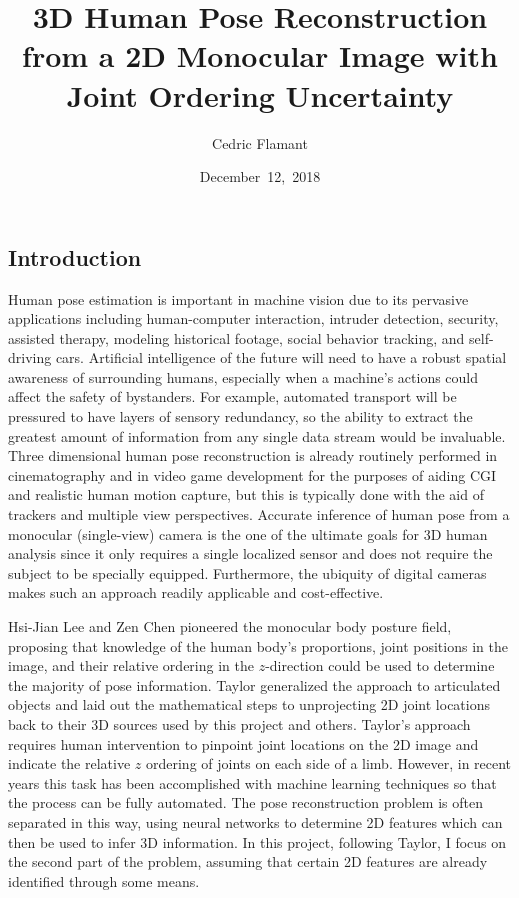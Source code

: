 \documentclass[final]{article}
\newcommand{\LectureTitle}{3D Human Pose Reconstruction from a 2D Monocular Image with Joint Ordering Uncertainty}
\newcommand{\LectureDate}{December\ 12,\ 2018}
\newcommand{\LatexerName}{Cedric Flamant}
\begin{document}
\begin{spacing}{1.1}

  \title{\LectureTitle}
  \author{\LatexerName}
  \date{\LectureDate}
  \maketitle


  \section{Introduction}
  
  Human pose estimation is important in machine vision due to its pervasive applications including human-computer interaction, intruder detection, security, assisted therapy, modeling historical footage, social behavior tracking, and self-driving cars. Artificial intelligence of the future will need to have a robust spatial awareness of surrounding humans, especially when a machine's actions could affect the safety of bystanders. For example, automated transport will be pressured to have layers of sensory redundancy, so the ability to extract the greatest amount of information from any single data stream would be invaluable. Three dimensional human pose reconstruction is already routinely performed in cinematography and in video game development for the purposes of aiding CGI and realistic human motion capture, but this is typically done with the aid of trackers and multiple view perspectives. Accurate inference of human pose from a monocular (single-view) camera is the one of the ultimate goals for 3D human analysis since it only requires a single localized sensor and does not require the subject to be specially equipped. Furthermore, the ubiquity of digital cameras makes such an approach readily applicable and cost-effective.
  
  Hsi-Jian Lee and Zen Chen pioneered the monocular body posture field, proposing that knowledge of the human body's proportions, joint positions in the image, and their relative ordering in the $z$-direction could be used to determine the majority of pose information\cite{Lee}. Taylor\cite{Taylor} generalized the approach to articulated objects and laid out the mathematical steps to unprojecting 2D joint locations back to their 3D sources used by this project and others\cite{Jiang}. Taylor's approach requires human intervention to pinpoint joint locations on the 2D image and indicate the relative $z$ ordering of joints on each side of a limb. However, in recent years this task has been accomplished with machine learning techniques so that the process can be fully automated\cite{Fan}. The pose reconstruction problem is often separated in this way, using neural networks to determine 2D features which can then be used to infer 3D information. In this project, following Taylor, I focus on the second part of the problem, assuming that certain 2D features are already identified through some means.


\end{spacing}
\end{document}

